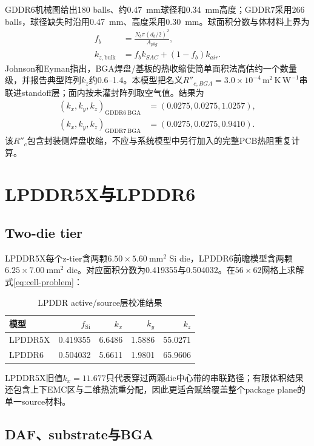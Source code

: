 \documentclass[UTF8,zihao=-4]{ctexart}
\newcommand{\kxyz}{(k_x,k_y,k_z)}
\newcommand{\unitr}{\mathrm{m^2\,K\,W^{-1}}}
\begin{document}
GDDR6机械图给出180 balls、约\SI{0.47}{mm}球径和\SI{0.34}{mm}高度\cite{MicronGDDR6}；GDDR7采用266 balls，球径缺失时沿用\SI{0.47}{mm}、高度采用\SI{0.30}{mm}。球面积分数与体材料上界为
\begin{align}
  f_b&=\frac{N_b\pi(d_b/2)^2}{A_{pkg}},\\
  k_{z,\mathrm{bulk}}&=f_bk_{SAC}+(1-f_b)k_{air}.
\end{align}
Johnson和Eyman指出，BGA焊盘/基板的热收缩使简单面积法高估约一个数量级，并报告典型阵列$k_z$约\SIrange{0.6}{1.4}{\tcond}\cite{JohnsonEyman1998}。本模型把名义$R''_{c,BGA}=3.0\times10^{-4}\,\unitr$串联进standoff层；面内按未灌封阵列取空气值。结果为
\begin{align}
  \kxyz_{\mathrm{GDDR6\ BGA}}&=(0.0275,0.0275,1.0257),\\
  \kxyz_{\mathrm{GDDR7\ BGA}}&=(0.0275,0.0275,0.9410).
\end{align}
该$R''_c$包含封装侧焊盘收缩，不应与系统模型中另行加入的完整PCB热阻重复计算。

\section{LPDDR5X与LPDDR6}

\subsection{Two-die tier}

LPDDR5X每个z-tier含两颗$6.50\times5.60~\mathrm{mm^2}$ Si die，LPDDR6前瞻模型含两颗$6.25\times7.00~\mathrm{mm^2}$ die。对应面积分数为0.419355与0.504032。在$56\times62$网格上求解式\eqref{eq:cell-problem}：

\begin{table}[htbp]
\centering
\caption{LPDDR active/source层校准结果}
\begin{tabular}{lrrrr}
\toprule
模型 & $f_{\mathrm{Si}}$ & $k_x$ & $k_y$ & $k_z$ \\
\midrule
LPDDR5X & 0.419355 & 6.6486 & 1.5886 & 55.0271 \\
LPDDR6 & 0.504032 & 5.6611 & 1.9801 & 65.9606 \\
\bottomrule
\end{tabular}
\end{table}

LPDDR5X旧值$k_x=11.677$只代表穿过两颗die中心带的串联路径；有限体积结果还包含上下EMC区与二维热流重分配，因此更适合赋给覆盖整个package plane的单一source材料。

\subsection{DAF、substrate与BGA}
\end{document}
